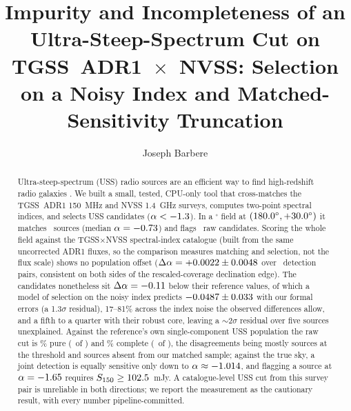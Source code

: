 \documentclass[twocolumn]{aastex631}
\begin{document}
\title{Impurity and Incompleteness of an Ultra-Steep-Spectrum Cut on TGSS~ADR1~$\times$~NVSS:
Selection on a Noisy Index and Matched-Sensitivity Truncation}

\author[0009-0008-3289-4447]{Joseph Barbere}

\begin{abstract}
Ultra-steep-spectrum (USS) radio sources are an efficient way to find high-redshift radio galaxies
\citep{debreuck2000}. We built a small, tested, CPU-only tool that cross-matches the TGSS~ADR1
150~MHz \citep{intema2017} and NVSS 1.4~GHz \citep{condon1998} surveys, computes two-point spectral
indices, and selects USS candidates ($\alpha<-1.3$). In a \usRadius$^\circ$ field at
$(180.0^\circ, +30.0^\circ)$ it matches \usNmatched\ sources (median
$\alpha=-0.73$) and flags \usNuss\ raw candidates. Scoring the whole field against the
\citet{degasperin2018} TGSS$\times$NVSS spectral-index catalogue (built from the same
uncorrected ADR1 fluxes, so the comparison measures matching and selection, not the flux scale)
shows no population offset ($\Delta\alpha=+0.0022\pm0.0048$ over
\usRealNPairs\ detection pairs, consistent on both sides of the rescaled-coverage declination edge).
The candidates nonetheless sit $\Delta\alpha=-0.11$ below their reference values,
of which a model of selection on the noisy index predicts $-0.0487\pm0.033$
with our formal errors (a 1.3$\sigma$ residual), 17--81\% across the index noise the observed
differences allow, and a fifth to a quarter with their robust core, leaving a $\sim$2$\sigma$ residual
over five sources unexplained. Against the
reference's own single-component USS population the raw cut is \usRealPurityPct\% pure
(\usRealNFlaggedRefUss\ of \usNuss) and \usRealCompletenessPct\% complete
(\usRealNRefUssRec\ of \usRealNRefUss), the disagreements being mostly sources at the threshold
and sources absent from our matched sample; against the true sky, a joint detection is
equally sensitive only down to $\alpha\approx-1.014$, and flagging a source at
$\alpha=-1.65$ requires $S_{150}\geq102.5$~mJy. A catalogue-level USS cut from
this survey pair is unreliable in both directions; we report the measurement as the cautionary
result, with every number pipeline-committed.
\end{abstract}

\end{document}
